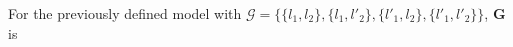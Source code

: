\begin{frame}
For the previously defined model with $\mathcal{G} = \{\{l_1,l_2 \},\{l_1,l'_2 \},\{l'_1,l_2\},\{l'_1,l'_2\} \}$, $\mathbf{G}$ is
\begin{center}
\begin{tiny}

\end{tiny}
\end{center}
\end{frame}
